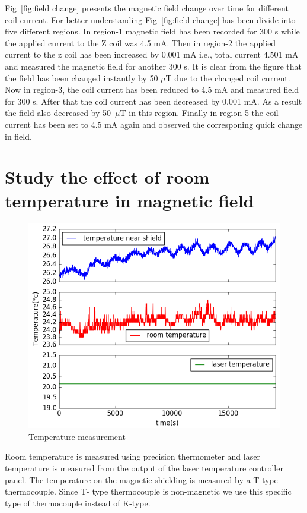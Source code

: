 \begin{itemize}
 Fig~\ref{fig:field change} presents the magnetic field change over time for different coil current. For better understanding Fig~\ref{fig:field change} has been divide into five different regions. In region-1 magnetic field  has been recorded for 300 s while the applied current to the Z coil was 4.5 mA. Then in region-2 the applied current to the z coil has been increased by 0.001 mA i.e., total current 4.501 mA and measured the magnetic field for another 300 s. It is clear from the figure that the field has been changed instantly by 50 $\mu$T due to the changed coil current. Now in region-3, the coil current has been reduced to 4.5 mA and measured field for 300 s. After that the coil current has been decreased by 0.001 mA. As a result the field also decreased by 50~$\mu$T in this region.  Finally in region-5 the coil current has been set to 4.5 mA again and observed the corresponing quick change in field.
   \end{itemize}
    \section{Study the effect of room temperature in magnetic field} 
 \begin{figure}[h]
\centering\includegraphics[width=0.8\linewidth]{figures/temp_.png}
\caption{Temperature measurement\label{fig:temperature measurement}}
\end{figure}
 Room temperature is measured using precision thermometer and laser temperature is measured from the output of the laser temperature controller panel. The temperature on the magnetic shielding is measured by a T-type thermocouple.  Since T- type thermocouple is non-magnetic we use this specific type of thermocouple instead of K-type. 
 
